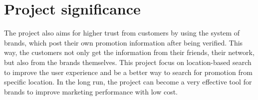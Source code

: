 \section{Project significance}
The project also aims for higher trust from customers by using the system of brands, which post their own promotion information after being verified. This way, the customers not only get the information from their friends, their network, but also from the brands themselves. This project focus on location-based search to improve the user experience and be a better way to search for promotion from specific location. In the long run, the project can become a very effective tool for brands to improve marketing performance with low cost.

